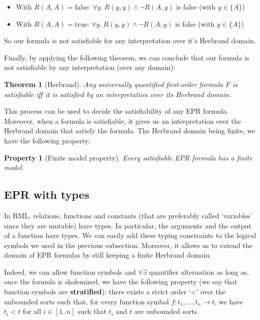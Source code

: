 \documentclass[11pt,a4paper,oldfontcommands,openany]{memoir}
\newtheorem*{theorem}{Theorem}
\newtheorem*{property}{Property}
\begin{document}
        \begin{itemize}
            \item With \(R(A,A)=\text{false}\): \(\forall y. \ R(y,y) \land \neg R(A,y)\) is false (with \( y \in \{A\} \))
            \item With \(R(A,A)=\text{true}\): \(\forall y. \ R(y,y) \land \neg R(A,y)\) is false (with \( y \in \{A\} \))
        \end{itemize}

        So our formula is not satisfiable for any interpretation over it's Herbrand domain.

        Finally, by applying the following theorem, we can conclude that our formula is not satisfiable by any interpretation (over any domain):
        \begin{theorem}[Herbrand]
            Any universally quantified first-order formula \(F\) is satisfiable iff it is satisfied by an interpretation over its Herbrand domain.
        \end{theorem}

        This process can be used to decide the satisfiability of any EPR formula. Moreover, when a formula is satisfiable,
        it gives us an interpretation over the Herbrand domain that satisfy the formula.
        The Herbrand domain being finite, we have the following property:

        \begin{property}[Finite model property]
            Every satisfiable EPR formula has a finite model.
        \end{property}

        \subsection{EPR with types}

        In RML, relations, functions and constants (that are preferably called `variables' since they are mutable) have types.
        In particular, the arguments and the output of a function have types.
        We can easily add these typing constraints to the logical symbols we used in the previous subsection.
        Moreover, it allows us to extend the domain of EPR formulas by still keeping a finite Herbrand domain.

        Indeed, we can allow function symbols and \(\forall\exists\) quantifier alternation as long as,
        once the formula is skolemized, we have the following property (we say that function symbols are \textbf{stratified}):
        there exists a strict order `<' over the unbounded sorts such that,
        for every function symbol \( f: t_1,\ldots,t_n \to t \), we have \( t_i < t \) for all \(i \in [1..n]\) such that \(t_i\) and \(t\)
        are unbounded sorts. 
\end{document}
